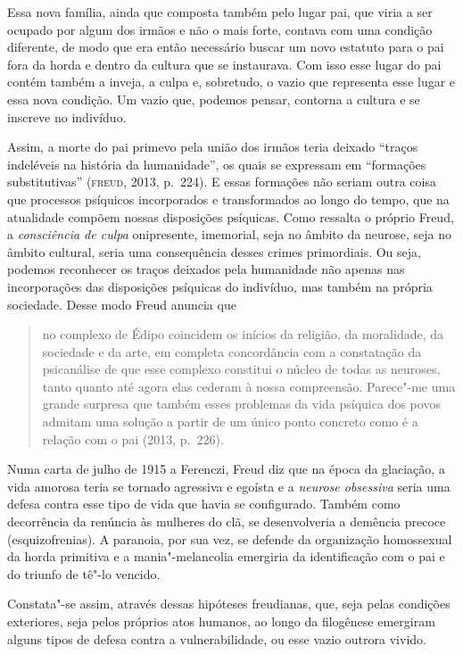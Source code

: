 Essa nova família, ainda que composta também pelo lugar pai, que viria a
ser ocupado por algum dos irmãos e não o mais forte, contava com uma
condição diferente, de modo que era então necessário buscar um novo
estatuto para o pai fora da horda e dentro da cultura que se instaurava.
Com isso esse lugar do pai contém também a inveja, a culpa e, sobretudo,
o vazio que representa esse lugar e essa nova condição. Um vazio que,
podemos pensar, contorna a cultura e se inscreve no indivíduo.

Assim, a morte do pai primevo pela união dos irmãos teria deixado
``traços indeléveis na história da humanidade'', os quais se expressam
em ``formações substitutivas'' (\textsc{freud}, 2013, p.~224). E essas
formações não seriam outra coisa que processos psíquicos incorporados e
transformados ao longo do tempo, que na atualidade compõem nossas
disposições psíquicas. Como ressalta o próprio Freud, a
\emph{consciência de culpa} onipresente, imemorial, seja no âmbito da
neurose, seja no âmbito cultural, seria uma consequência desses crimes
primordiais. Ou seja, podemos reconhecer os traços deixados pela
humanidade não apenas nas incorporações das disposições psíquicas do
indivíduo, mas também na própria sociedade. Desse modo Freud anuncia
que

\begin{quote}
no complexo de Édipo coincidem os inícios da religião, da moralidade, da
sociedade e da arte, em completa concordância com a constatação da
psicanálise de que esse complexo constitui o núcleo de todas as
neuroses, tanto quanto até agora elas cederam à nossa compreensão.
Parece"-me uma grande surpresa que também esses problemas da vida
psíquica dos povos admitam uma solução a partir de um único ponto
concreto como é a relação com o pai (2013, p.~226).
\end{quote}

Numa carta de julho de 1915 a Ferenczi, Freud diz que na época da
glaciação, a vida amorosa teria se tornado agressiva e egoísta e a
\emph{neurose obsessiva} seria uma defesa contra esse tipo de vida que
havia se configurado. Também como decorrência da renúncia às mulheres do
clã, se desenvolveria a demência precoce (esquizofrenias). A paranoia,
por sua vez, se defende da organização homossexual da horda primitiva e a
mania"-melancolia emergiria da identificação com o pai e do triunfo de
tê"-lo vencido.

Constata"-se assim, através dessas hipóteses freudianas, que, seja pelas
condições exteriores, seja pelos próprios atos humanos, ao longo da
filogênese emergiram alguns tipos de defesa contra a vulnerabilidade, ou
esse vazio outrora vivido.


